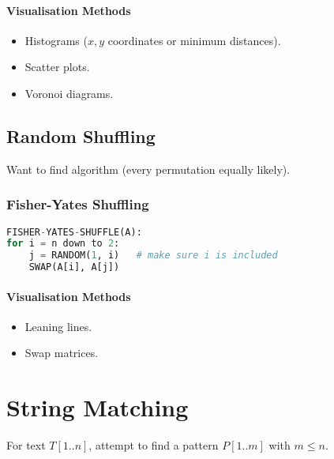 \documentclass[twocolumn,english]{article}
\numberwithin{equation}{section}
\numberwithin{figure}{section}
\numberwithin{table}{section}
\let\emph\relax
\begin{document}
\paragraph{Visualisation Methods}
\begin{itemize}
\item Histograms ($x,y$ coordinates or minimum distances).
\item Scatter plots.
\item Voronoi diagrams.
\end{itemize}

\subsection{Random Shuffling}

Want to find \emph{unbiased} algorithm (every permutation equally
likely).

\subsubsection*{Fisher-Yates Shuffling}

\begin{lstlisting}[language=Python,basicstyle={\footnotesize\ttfamily},tabsize=4,frame=single]
FISHER-YATES-SHUFFLE(A):
for i = n down to 2:
	j = RANDOM(1, i)   # make sure i is included
	SWAP(A[i], A[j])
\end{lstlisting}

\paragraph{Visualisation Methods}
\begin{itemize}
\item Leaning lines.
\item Swap matrices.
\end{itemize}

\section{String Matching}

For text $T\left[1..n\right]$, attempt to find a pattern $P\left[1..m\right]$
with $m\leq n$.
\end{document}

